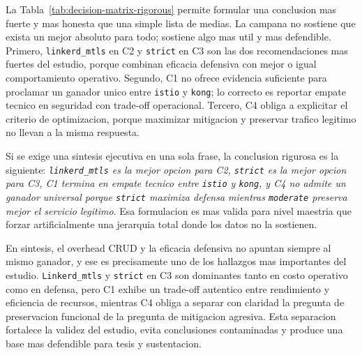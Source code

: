 La Tabla~\ref{tab:decision-matrix-rigorous} permite formular una conclusion mas fuerte y mas honesta que una simple lista de medias. La campana no sostiene que exista un mejor absoluto para todo; sostiene algo mas util y mas defendible. Primero, \texttt{linkerd\_mtls} en C2 y \texttt{strict} en C3 son las dos recomendaciones mas fuertes del estudio, porque combinan eficacia defensiva con mejor o igual comportamiento operativo. Segundo, C1 no ofrece evidencia suficiente para proclamar un ganador unico entre \texttt{istio} y \texttt{kong}; lo correcto es reportar empate tecnico en seguridad con trade-off operacional. Tercero, C4 obliga a explicitar el criterio de optimizacion, porque maximizar mitigacion y preservar trafico legitimo no llevan a la misma respuesta.

Si se exige una sintesis ejecutiva en una sola frase, la conclusion rigurosa es la siguiente: \textit{\texttt{linkerd\_mtls} es la mejor opcion para C2, \texttt{strict} es la mejor opcion para C3, C1 termina en empate tecnico entre \texttt{istio} y \texttt{kong}, y C4 no admite un ganador universal porque \texttt{strict} maximiza defensa mientras \texttt{moderate} preserva mejor el servicio legitimo}. Esa formulacion es mas valida para nivel maestria que forzar artificialmente una jerarquia total donde los datos no la sostienen.

En sintesis, el overhead CRUD y la eficacia defensiva no apuntan siempre al mismo ganador, y ese es precisamente uno de los hallazgos mas importantes del estudio. \texttt{Linkerd\_mtls} y \texttt{strict} en C3 son dominantes tanto en costo operativo como en defensa, pero C1 exhibe un trade-off autentico entre rendimiento y eficiencia de recursos, mientras C4 obliga a separar con claridad la pregunta de preservacion funcional de la pregunta de mitigacion agresiva. Esta separacion fortalece la validez del estudio, evita conclusiones contaminadas y produce una base mas defendible para tesis y sustentacion.